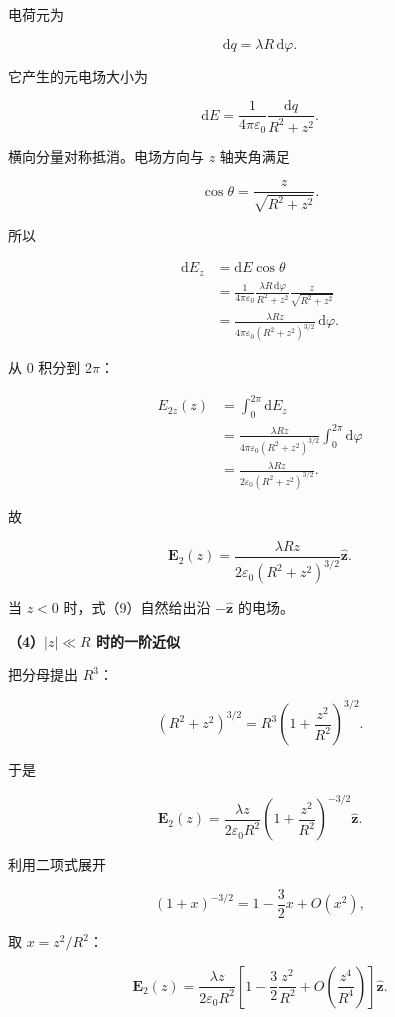\documentclass[12pt,a4paper,UTF8]{ctexart}
\begin{document}
电荷元为

\[
\mathrm dq=\lambda R\,\mathrm d\varphi.
\tag{6}
\]

它产生的元电场大小为

\[
\mathrm dE
=\frac1{4\pi\varepsilon_0}
\frac{\mathrm dq}{R^2+z^2}.
\tag{7}
\]

横向分量对称抵消。电场方向与 \(z\) 轴夹角满足

\[
\cos\theta=\frac{z}{\sqrt{R^2+z^2}}.
\tag{8}
\]

所以

\[
\begin{aligned}
\mathrm dE_z
&=\mathrm dE\cos\theta\\
&=\frac1{4\pi\varepsilon_0}
\frac{\lambda R\,\mathrm d\varphi}{R^2+z^2}
\frac{z}{\sqrt{R^2+z^2}}\\
&=\frac{\lambda Rz}{4\pi\varepsilon_0(R^2+z^2)^{3/2}}
\,\mathrm d\varphi.
\end{aligned}
\]

从 \(0\) 积分到 \(2\pi\)：

\[
\begin{aligned}
E_{2z}(z)
&=\int_0^{2\pi}\mathrm dE_z\\
&=\frac{\lambda Rz}{4\pi\varepsilon_0(R^2+z^2)^{3/2}}
\int_0^{2\pi}\mathrm d\varphi\\
&=\frac{\lambda Rz}{2\varepsilon_0(R^2+z^2)^{3/2}}.
\end{aligned}
\]

故

\[
\boxed{
\boldsymbol E_2(z)
=\frac{\lambda Rz}{2\varepsilon_0(R^2+z^2)^{3/2}}
\hat{\boldsymbol z}
}.
\tag{9}
\]

当 \(z<0\) 时，式（9）自然给出沿 \(-\hat{\boldsymbol z}\) 的电场。

\textbf{（4）\(|z|\ll R\) 时的一阶近似}

把分母提出 \(R^3\)：

\[
(R^2+z^2)^{3/2}
=R^3\left(1+\frac{z^2}{R^2}\right)^{3/2}.
\tag{10}
\]

于是

\[
\boldsymbol E_2(z)
=\frac{\lambda z}{2\varepsilon_0R^2}
\left(1+\frac{z^2}{R^2}\right)^{-3/2}
\hat{\boldsymbol z}.
\tag{11}
\]

利用二项式展开

\[
(1+x)^{-3/2}
=1-\frac32x+O(x^2),
\tag{12}
\]

取 \(x=z^2/R^2\)：

\[
\boldsymbol E_2(z)
=\frac{\lambda z}{2\varepsilon_0R^2}
\left[
1-\frac32\frac{z^2}{R^2}
+O\!\left(\frac{z^4}{R^4}\right)
\right]\hat{\boldsymbol z}.
\tag{13}
\]
\end{document}
